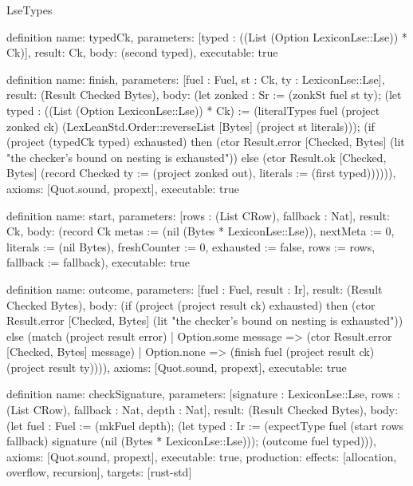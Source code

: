 \begin{lexlean}{LseTypes}
\begin{semanticmodule}
definition{
  name: typedCk,
  parameters: [typed : ((List (Option LexiconLse::Lse)) * Ck)],
  result: Ck,
  body: (second typed),
  executable: true
}

definition{
  name: finish,
  parameters: [fuel : Fuel, st : Ck, ty : LexiconLse::Lse],
  result: (Result Checked Bytes),
  body: (let zonked : Sr := (zonkSt fuel st ty); (let typed : ((List (Option LexiconLse::Lse)) * Ck) := (literalTypes fuel (project zonked ck) (LexLeanStd.Order::reverseList [Bytes] (project st literals))); (if (project (typedCk typed) exhausted) then (ctor Result.error [Checked, Bytes] (lit "the checker's bound on nesting is exhausted")) else (ctor Result.ok [Checked, Bytes] (record Checked {ty := (project zonked out), literals := (first typed)}))))),
  axioms: [Quot.sound, propext],
  executable: true
}

definition{
  name: start,
  parameters: [rows : (List CRow), fallback : Nat],
  result: Ck,
  body: (record Ck {metas := (nil (Bytes * LexiconLse::Lse)), nextMeta := 0, literals := (nil Bytes), freshCounter := 0, exhausted := false, rows := rows, fallback := fallback}),
  executable: true
}

definition{
  name: outcome,
  parameters: [fuel : Fuel, result : Ir],
  result: (Result Checked Bytes),
  body: (if (project (project result ck) exhausted) then (ctor Result.error [Checked, Bytes] (lit "the checker's bound on nesting is exhausted")) else (match (project result error)
    | Option.some message => (ctor Result.error [Checked, Bytes] message)
    | Option.none => (finish fuel (project result ck) (project result ty)))),
  axioms: [Quot.sound, propext],
  executable: true
}

definition{
  name: checkSignature,
  parameters: [signature : LexiconLse::Lse, rows : (List CRow), fallback : Nat, depth : Nat],
  result: (Result Checked Bytes),
  body: (let fuel : Fuel := (mkFuel depth); (let typed : Ir := (expectType fuel (start rows fallback) signature (nil (Bytes * LexiconLse::Lse))); (outcome fuel typed))),
  axioms: [Quot.sound, propext],
  executable: true,
  production: {effects: [allocation, overflow, recursion], targets: [rust-std]}
}


\end{semanticmodule}
\end{lexlean}
